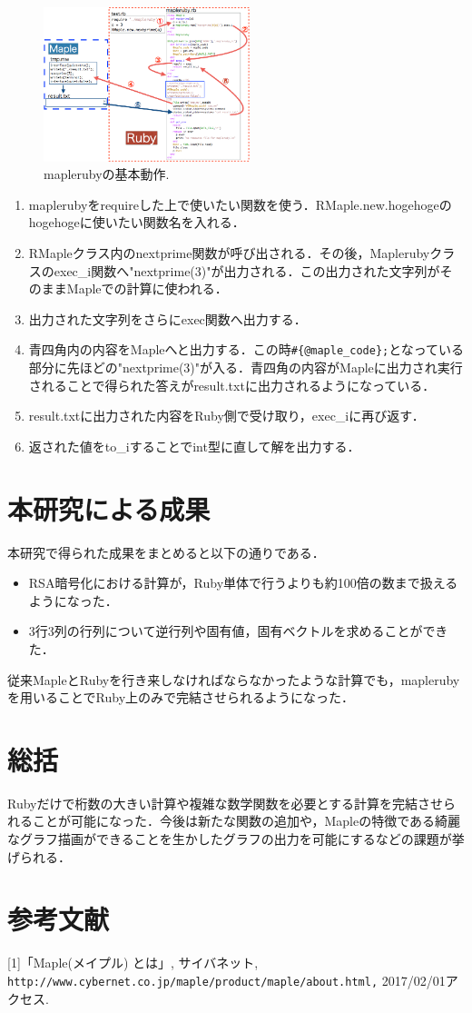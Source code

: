 \documentclass[10pt,a4j,twocolumn]{jsarticle}
\begin{document}
\begin{figure}[htbp]\begin{center}
\includegraphics[width=6cm]{./mapleruby_003.png}
\caption{maplerubyの基本動作.}
\label{default}\end{center}\end{figure}
\begin{enumerate}
\item maplerubyをrequireした上で使いたい関数を使う．RMaple.new.hogehogeのhogehogeに使いたい関数名を入れる．
\item RMapleクラス内のnextprime関数が呼び出される．その後，Maplerubyクラスのexec\_i関数へ"nextprime(3)"が出力される．この出力された文字列がそのままMapleでの計算に使われる．
\item 出力された文字列をさらにexec関数へ出力する．
\item 青四角内の内容をMapleへと出力する．この時\verb|#{@maple_code};|となっている部分に先ほどの"nextprime(3)"が入る．青四角の内容がMapleに出力され実行されることで得られた答えがresult.txtに出力されるようになっている．
\item result.txtに出力された内容をRuby側で受け取り，exec\_iに再び返す．
\item 返された値をto\_iすることでint型に直して解を出力する．
\end{enumerate}
\section{本研究による成果}
本研究で得られた成果をまとめると以下の通りである．

\begin{itemize}
\item RSA暗号化における計算が，Ruby単体で行うよりも約100倍の数まで扱えるようになった．
\item 3行3列の行列について逆行列や固有値，固有ベクトルを求めることができた．
\end{itemize}
従来MapleとRubyを行き来しなければならなかったような計算でも，maplerubyを用いることでRuby上のみで完結させられるようになった．

\section{総括}
Rubyだけで桁数の大きい計算や複雑な数学関数を必要とする計算を完結させられることが可能になった．今後は新たな関数の追加や，Mapleの特徴である綺麗なグラフ描画ができることを生かしたグラフの出力を可能にするなどの課題が挙げられる．

\section{参考文献}
[1]「Maple(メイプル) とは」, サイバネット, \verb|http://www.cybernet.co.jp/maple/product/maple/about.html,| 2017/02/01アクセス.
\end{document}
